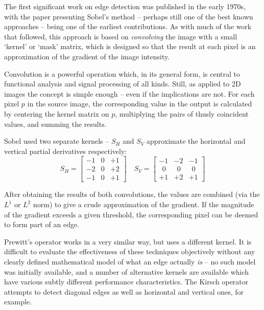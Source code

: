 \documentclass{acm_proc_article-sp}
\begin{document}
The first significant work on edge detection was published in the early 1970s,
with the paper presenting Sobel's method \cite{Sobel:1970:CMM:905376} --
perhaps still one of the best known approaches -- being one of the earliest
contributions. As with much of the work that followed, this
approach is based on \textit{convolving} the image with a small `kernel' or
`mask' matrix, which is designed so that the result at each pixel is an
approximation of the gradient of the image intensity. 

Convolution is a powerful operation which, in its general form, is central to
functional analysis and signal processing of all kinds. Still, as applied to 2D
images the concept is simple enough -- even if the implications are not. For each
pixel $p$ in the source image, the corresponding value in the output is
calculated by centering the kernel matrix on $p$, multiplying the pairs of
thusly coincident values, and summing the results.

Sobel used two separate kernels -- $S_H$ and $S_V$ approximate the horizontal
and vertical partial derivatives respectively:
\begin{displaymath}
S_H = \begin{bmatrix} 
-1 & 0 & +1 \\
-2 & 0 & +2 \\
-1 & 0 & +1 
\end{bmatrix}
\quad
S_V = \begin{bmatrix} 
-1 & -2 & -1  \\
\ \ 0 & \ \ 0 & \ \ 0 \\
+1 & +2 & +1 
\end{bmatrix}
\end{displaymath}

After obtaining the results of both convolutions, the values are combined (via
the $L^1$ or $L^2$ norm) to give a crude approximation of the gradient. If the
magnitude of the gradient exceeds a given threshold, the corresponding pixel
can be deemed to form part of an edge.

Prewitt's operator\cite{prewitt1970object} works in a very similar way, but
uses a different kernel. It is difficult to evaluate the effectiveness of these
techniques objectively without any clearly defined mathematical model of what
an edge actually \emph{is} -- no such model was initially available, and a
number of alternative kernels are available which have various subtly different
performance characteristics. The Kirsch operator\cite{kirsch1971computer} attempts to detect diagonal
edges as well as horizontal and vertical ones, for example.
\end{document}
